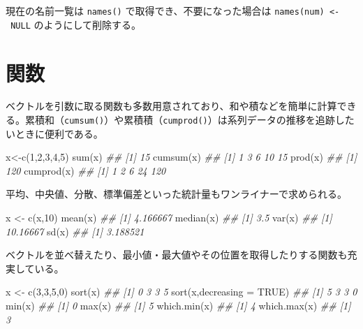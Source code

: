 \documentclass[
  letterpaper,
  xelatex,
  ja=standard, xelatex]{bxjsbook}
\newenvironment{Shaded}{\begin{snugshade}}{\end{snugshade}}
\newcommand{\AttributeTok}[1]{\textcolor[rgb]{0.40,0.45,0.13}{#1}}
\newcommand{\ConstantTok}[1]{\textcolor[rgb]{0.56,0.35,0.01}{#1}}
\newcommand{\DecValTok}[1]{\textcolor[rgb]{0.68,0.00,0.00}{#1}}
\newcommand{\DocumentationTok}[1]{\textcolor[rgb]{0.37,0.37,0.37}{\textit{#1}}}
\newcommand{\FunctionTok}[1]{\textcolor[rgb]{0.28,0.35,0.67}{#1}}
\newcommand{\NormalTok}[1]{\textcolor[rgb]{0.00,0.23,0.31}{#1}}
\newcommand{\OtherTok}[1]{\textcolor[rgb]{0.00,0.23,0.31}{#1}}
\begin{document}
現在の名前一覧は \texttt{names()} で取得でき、不要になった場合は
\texttt{names(num)\ \textless{}-\ NULL} のようにして削除する。

\section{関数}\label{ux95a2ux6570}

ベクトルを引数に取る関数も多数用意されており、和や積などを簡単に計算できる。累積和（\texttt{cumsum()}）や累積積（\texttt{cumprod()}）は系列データの推移を追跡したいときに便利である。

\begin{Shaded}
\begin{Highlighting}[]
\NormalTok{x}\OtherTok{\textless{}{-}}\FunctionTok{c}\NormalTok{(}\DecValTok{1}\NormalTok{,}\DecValTok{2}\NormalTok{,}\DecValTok{3}\NormalTok{,}\DecValTok{4}\NormalTok{,}\DecValTok{5}\NormalTok{)}
\FunctionTok{sum}\NormalTok{(x)}
\DocumentationTok{\#\# [1] 15}
\FunctionTok{cumsum}\NormalTok{(x)}
\DocumentationTok{\#\# [1]  1  3  6 10 15}
\FunctionTok{prod}\NormalTok{(x)}
\DocumentationTok{\#\# [1] 120}
\FunctionTok{cumprod}\NormalTok{(x)}
\DocumentationTok{\#\# [1]   1   2   6  24 120}
\end{Highlighting}
\end{Shaded}

平均、中央値、分散、標準偏差といった統計量もワンライナーで求められる。

\begin{Shaded}
\begin{Highlighting}[]
\NormalTok{x }\OtherTok{\textless{}{-}} \FunctionTok{c}\NormalTok{(x,}\DecValTok{10}\NormalTok{)}
\FunctionTok{mean}\NormalTok{(x)}
\DocumentationTok{\#\# [1] 4.166667}
\FunctionTok{median}\NormalTok{(x)}
\DocumentationTok{\#\# [1] 3.5}
\FunctionTok{var}\NormalTok{(x)}
\DocumentationTok{\#\# [1] 10.16667}
\FunctionTok{sd}\NormalTok{(x)}
\DocumentationTok{\#\# [1] 3.188521}
\end{Highlighting}
\end{Shaded}

ベクトルを並べ替えたり、最小値・最大値やその位置を取得したりする関数も充実している。

\begin{Shaded}
\begin{Highlighting}[]
\NormalTok{x }\OtherTok{\textless{}{-}} \FunctionTok{c}\NormalTok{(}\DecValTok{3}\NormalTok{,}\DecValTok{3}\NormalTok{,}\DecValTok{5}\NormalTok{,}\DecValTok{0}\NormalTok{)}
\FunctionTok{sort}\NormalTok{(x)}
\DocumentationTok{\#\# [1] 0 3 3 5}
\FunctionTok{sort}\NormalTok{(x,}\AttributeTok{decreasing =} \ConstantTok{TRUE}\NormalTok{)}
\DocumentationTok{\#\# [1] 5 3 3 0}
\FunctionTok{min}\NormalTok{(x)}
\DocumentationTok{\#\# [1] 0}
\FunctionTok{max}\NormalTok{(x)}
\DocumentationTok{\#\# [1] 5}
\FunctionTok{which.min}\NormalTok{(x)}
\DocumentationTok{\#\# [1] 4}
\FunctionTok{which.max}\NormalTok{(x)}
\DocumentationTok{\#\# [1] 3}
\end{Highlighting}
\end{Shaded}
\end{document}
